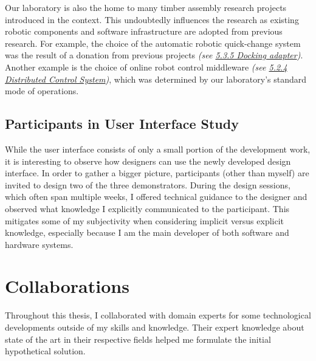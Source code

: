 \documentclass[11pt]{book}
\begin{document}
Our laboratory is also the home to many timber assembly research projects introduced in the context. This undoubtedly influences the research as existing robotic components and software infrastructure are adopted from previous research. For example, the choice of the automatic robotic quick-change system was the result of a donation from previous projects \textit{(see \underline{5.3.5 Docking adapter})}. Another example is the choice of online robot control middleware \textit{(see \underline{5.2.4 Distributed Control System})}, which was determined by our laboratory's standard mode of operations.

\subsection{Participants in User Interface Study}

While the user interface consists of only a small portion of the development work, it is interesting to observe how designers can use the newly developed design interface. In order to gather a bigger picture, participants (other than myself) are invited to design two of the three demonstrators. During the design sessions, which often span multiple weeks, I offered technical guidance to the designer and observed what knowledge I explicitly communicated to the participant. This mitigates some of my subjectivity when considering implicit versus explicit knowledge, especially because I am the main developer of both software and hardware systems. 

\section{Collaborations}

Throughout this thesis, I collaborated with domain experts for some technological developments outside of my skills and knowledge. Their expert knowledge about state of the art in their respective fields helped me formulate the initial hypothetical solution. 
\end{document}
